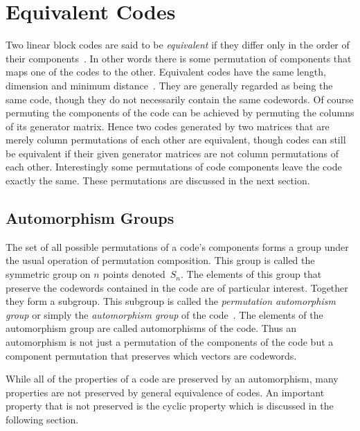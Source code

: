 \section{Equivalent Codes}
\label{sect:equivcodes}
Two linear block codes are said to be \emph{equivalent} if they differ only in the order of their components~\cite[p.~24]{mac77}.
In other words there is some permutation of components that maps one of the codes to the other.
Equivalent codes have the same length, dimension and minimum distance~\cite[p.~20]{huf03}.
They are generally regarded as being the same code, though they do not necessarily contain the same codewords.
Of course permuting the components of the code can be achieved by permuting the columns of its generator matrix.
Hence two codes generated by two matrices that are merely column permutations of each other are equivalent, though codes can still be equivalent if their given generator matrices are not column permutations of each other.
Interestingly some permutations of code components leave the code exactly the same.
These permutations are discussed in the next section.

\subsection{Automorphism Groups}
The set of all possible permutations of a code's components forms a group under the usual operation of permutation composition.
This group is called the symmetric group on $n$ points denoted~$S_n$.
The elements of this group that preserve the codewords contained in the code are of particular interest.
Together they form a subgroup.
This subgroup is called the \emph{permutation automorphism group} or simply the \emph{automorphism group} of the code~\cite[p.~22]{huf03}.
The elements of the automorphism group are called automorphisms of the code.
Thus an automorphism is not just a permutation of the components of the code but a component permutation that preserves which vectors are codewords.

While all of the properties of a code are preserved by an automorphism, many properties are not preserved by general equivalence of codes.
An important property that is not preserved is the cyclic property which is discussed in the following section.

